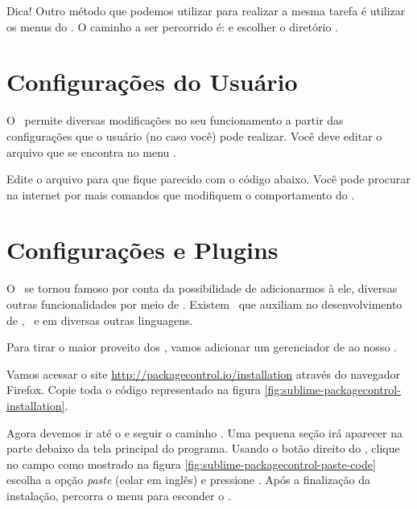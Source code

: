 Dica! Outro método que podemos utilizar para realizar a mesma tarefa é utilizar
os menus do \sublime. O caminho a ser percorrido é: 
e escolher o diretório .


\section{Configurações do Usuário}
\label{configuracoes-do-usuario}

O \sublime~permite diversas modificações no seu funcionamento a partir das configurações
que o usuário (no caso você) pode realizar. Você deve editar o arquivo 
que se encontra no menu .

Edite o arquivo para que fique parecido com o código abaixo. Você pode procurar
na internet por mais comandos que modifiquem o comportamento do \sublime.



\section{Configurações e Plugins}
\label{configuracoes-e-plugins}

O \sublime~se tornou famoso por conta da possibilidade de adicionarmos à ele,
diversas outras funcionalidades por meio de \plugins. Existem \plugins~que auxiliam
no desenvolvimento de \html, \css~e em diversas outras linguagens.

Para tirar o maior proveito dos \plugins, vamos adicionar um gerenciador de
\plugins ao nosso \sublime.

Vamos acessar o site \url{http://packagecontrol.io/installation} através do navegador 
Firefox. Copie toda o código representado na figura \ref{fig:sublime-packagecontrol-installation}.

Agora devemos ir até o \sublime e seguir o caminho .
Uma pequena seção irá aparecer na parte debaixo da tela principal do programa.
Usando o botão direito do \mouse, clique no campo como mostrado na figura 
\ref{fig:sublime-packagecontrol-paste-code} escolha a opção \textit{paste} (colar em inglês)
e pressione \avancar. Após a finalização da instalação, percorra o menu  
para esconder o \terminal.


